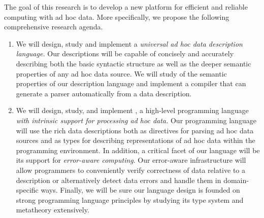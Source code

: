 \documentclass[11pt]{article}
\begin{document}
The goal of this research is to develop a new platform for
efficient and reliable computing with ad hoc data.
More specifically, we propose the following comprehensive 
research agenda.

\begin{enumerate}
\item We will design, study and implement
a {\em universal ad hoc data description language.}
Our descriptions will be capable of
concisely and accurately describing both the basic syntactic structure
as well as the deeper semantic properties of any ad hoc data source.
We will study of the semantic properties of our description language
and implement a compiler that can
generate a parser automatically from a data description.

\item We will design, study, and implement  \datatype{}, a 
high-level programming language {\em with 
intrinsic support for 
processing ad hoc data.}  Our programming language will use the
rich data descriptions both as directives for
parsing ad hoc data sources and as types for describing
representations of ad hoc data within the programming environment.  
In addition,
a critical facet of our language will be its support for
{\em error-aware computing}.  Our error-aware infrastructure 
will allow programmers to conveniently
verify correctness of data relative to a description or 
alternatively detect data errors and handle them in domain-specific
ways.  Finally, we will be sure
our language design is founded on
strong programming language principles by
studying its type system and metatheory extensively. 


\end{enumerate}
\end{document}
